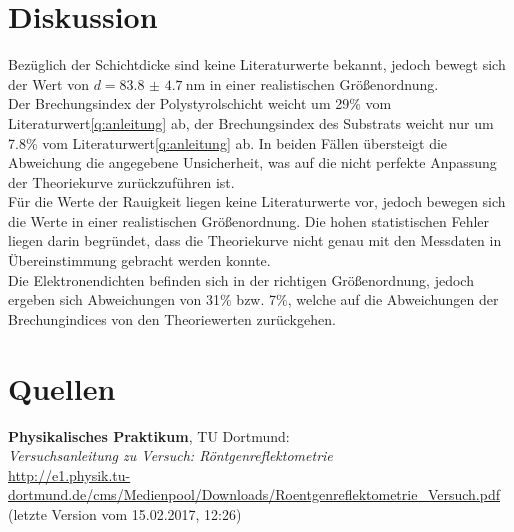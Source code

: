 \documentclass[captions=tableheading]{scrartcl}
\begin{document}
\section{Diskussion}
Bezüglich der Schichtdicke sind keine Literaturwerte bekannt, jedoch bewegt sich der Wert von $d=\SI{83.8(47)}{\nano \metre}$ in einer realistischen Größenordnung. \\
Der Brechungsindex der Polystyrolschicht weicht um 29\% vom Literaturwert\ref{q:anleitung} ab, der Brechungsindex des Substrats weicht nur um 7.8\% vom Literaturwert\ref{q:anleitung} ab. In beiden Fällen übersteigt die Abweichung die angegebene Unsicherheit, was auf die nicht perfekte Anpassung der Theoriekurve zurückzuführen ist. \\
Für die Werte der Rauigkeit liegen keine Literaturwerte vor, jedoch bewegen sich die Werte in einer realistischen Größenordnung. Die hohen statistischen Fehler liegen darin begründet, dass die Theoriekurve nicht genau mit den Messdaten in Übereinstimmung gebracht werden konnte. \\
Die Elektronendichten befinden sich in der richtigen Größenordnung, jedoch ergeben sich Abweichungen von 31\% bzw. 7\%, welche auf die Abweichungen der Brechungindices von den Theoriewerten zurückgehen.

\section{Quellen}
\begin{enumerate}[label={[\arabic*]}]
\item \label{q:anleitung} \textbf{Physikalisches Praktikum}, TU Dortmund: \\
\textit{Versuchsanleitung zu Versuch: Röntgenreflektometrie} \\
\url{http://e1.physik.tu-dortmund.de/cms/Medienpool/Downloads/Roentgenreflektometrie_Versuch.pdf} (letzte Version vom 15.02.2017, 12:26)
\end{enumerate}
\end{document}
